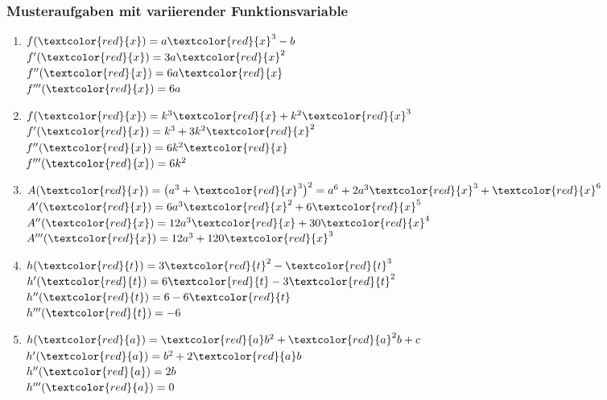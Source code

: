 \subsubsection{Musteraufgaben mit variierender Funktionsvariable}
\begin{multicols}{2}
\begin{enumerate}
    \item $f(\textcolor{red}{x}) = a\textcolor{red}{x}^3-b$\\
    $f'(\textcolor{red}{x}) = 3a\textcolor{red}{x}^2$\\
    $f''(\textcolor{red}{x}) = 6a\textcolor{red}{x}$\\
    $f'''(\textcolor{red}{x}) = 6a$
    \item $f(\textcolor{red}{x}) = k^3\textcolor{red}{x}+k^2\textcolor{red}{x}^3$\\
    $f'(\textcolor{red}{x}) = k^3+3k^2\textcolor{red}{x}^2$\\
    $f''(\textcolor{red}{x}) = 6k^2\textcolor{red}{x}$\\
    $f'''(\textcolor{red}{x}) = 6k^2$
    \item $A(\textcolor{red}{x}) = \big(a^3+\textcolor{red}{x}^3\big)^2 =
    a^6+2a^3\textcolor{red}{x}^3+\textcolor{red}{x}^6$\\
    $A'(\textcolor{red}{x}) = 6a^3\textcolor{red}{x}^2+6\textcolor{red}{x}^5$\\
    $A''(\textcolor{red}{x}) = 12a^3\textcolor{red}{x}+30\textcolor{red}{x}^4$\\
    $A'''(\textcolor{red}{x}) = 12a^3+120\textcolor{red}{x}^3$
    \item $h(\textcolor{red}{t}) = 3\textcolor{red}{t}^2-\textcolor{red}{t}^3$\\
    $h'(\textcolor{red}{t}) = 6\textcolor{red}{t}-3\textcolor{red}{t}^2$\\
    $h''(\textcolor{red}{t}) = 6-6\textcolor{red}{t}$\\
    $h'''(\textcolor{red}{t}) = -6$
    \item $h(\textcolor{red}{a}) = \textcolor{red}{a}b^2+\textcolor{red}{a}^2b+c$\\
    $h'(\textcolor{red}{a}) = b^2+2\textcolor{red}{a}b$\\
    $h''(\textcolor{red}{a}) = 2b$\\
    $h'''(\textcolor{red}{a}) = 0$
\end{enumerate}
\end{multicols}
